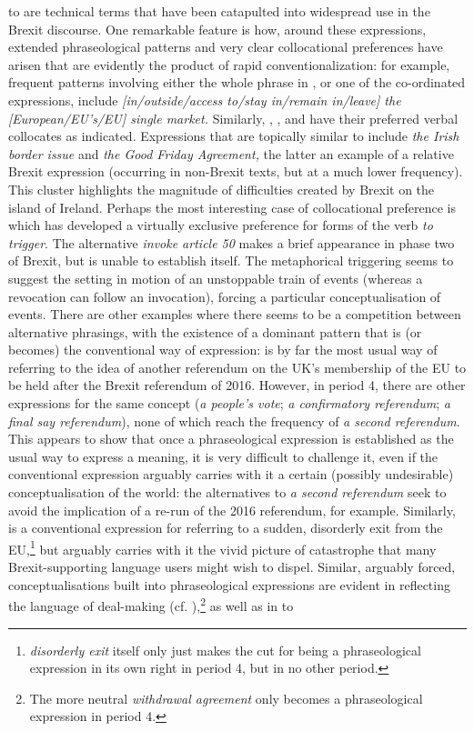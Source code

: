 \documentclass[output=paper]{langscibook}
\begin{document}
 to  are technical terms that have been catapulted into widespread use in the Brexit discourse. One remarkable feature is how, around these expressions, extended phraseological patterns and very clear collocational preferences have arisen that are evidently the product of rapid conventionalization: for example, frequent patterns involving either the whole phrase in , or one of the co-ordinated expressions, include \textit{[in/outside/access to/stay in/remain in/leave] the [European/EU’s/EU] single market.} Similarly, , ,  and  have their preferred verbal collocates as indicated. Expressions that are topically similar to  include \textit{the Irish border issue} and \textit{the Good Friday Agreement,} the latter an example of a relative Brexit expression (occurring in non-Brexit texts, but at a much lower frequency). This cluster highlights the magnitude of difficulties created by Brexit on the island of Ireland. Perhaps the most interesting case of collocational preference is  which has developed a virtually exclusive preference for forms of the verb \textit{to trigger}. The alternative \textit{invoke article 50} makes a brief appearance in phase two of Brexit, but is unable to establish itself. The metaphorical triggering seems to suggest the setting in motion of an unstoppable train of events (whereas a revocation can follow an invocation), forcing a particular conceptualisation of events. There are other examples where there seems to be a competition between alternative phrasings, with the existence of a dominant pattern that is (or becomes) the conventional way of expression:  is by far the most usual way of referring to the idea of another referendum on the UK’s membership of the EU to be held after the Brexit referendum of 2016. However, in period 4, there are other expressions for the same concept (\textit{a people’s vote}; \textit{a confirmatory referendum}; \textit{a final say referendum}), none of which reach the frequency of \textit{a second referendum}. This appears to show that once a phraseological expression is established as the usual way to express a meaning, it is very difficult to challenge it, even if the conventional expression arguably carries with it a certain (possibly undesirable) conceptualisation of the world: the alternatives to \textit{a second referendum} seek to avoid the implication of a re-run of the 2016 referendum, for example. Similarly,  is a conventional expression for referring to a sudden, disorderly exit from the EU,\footnote{\textit{disorderly exit} itself only just makes the cut for being a phraseological expression in its own right in period 4, but in no other period.} but arguably carries with it the vivid picture of catastrophe that many Brexit-supporting language users might wish to dispel. Similar, arguably forced, conceptualisations built into phraseological expressions are evident in  reflecting the language of deal-making (cf. \citealt{Achilleos-SarllMartill2019}),\footnote{The more neutral \textit{withdrawal agreement} only becomes a phraseological expression in period 4.} as well as in  to 
\end{document}
